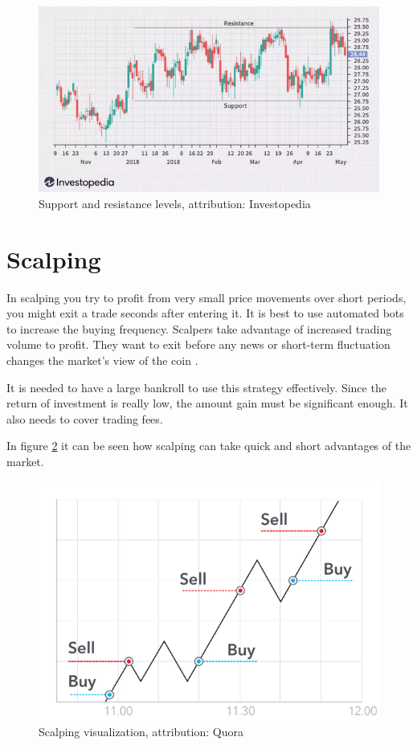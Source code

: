 \begin{figure}[ht]
    \centering
    \includegraphics[width=\columnwidth]{figures/dotdash-final-trading-range.png}
    \caption{Support and resistance levels, attribution: Investopedia \cite{investopedia:trading-range}}
    \label{sup-and-res-levels}
\end{figure}

\section{Scalping}
In scalping you try to profit from very small price movements over short periods, you might exit a trade seconds after entering it. It is best to use automated bots to increase the buying frequency. Scalpers take advantage of increased trading volume to profit. They want to exit before any news or short-term fluctuation changes the market's view of the coin \cite{best-crypto-daytrading}.

It is needed to have a large bankroll to use this strategy effectively. Since the return of investment is really low, the amount gain must be significant enough. It also needs to cover trading fees. 

In figure \ref{scalping-figure} it can be seen how scalping can take quick and short advantages of the market.

\begin{figure}[ht]
    \label{scalping-figure}
    \centering
    \includegraphics[width=\columnwidth]{figures/scalping.png}
    \caption{Scalping visualization, attribution: Quora \cite{best-crypto-daytrading}}
\end{figure}

